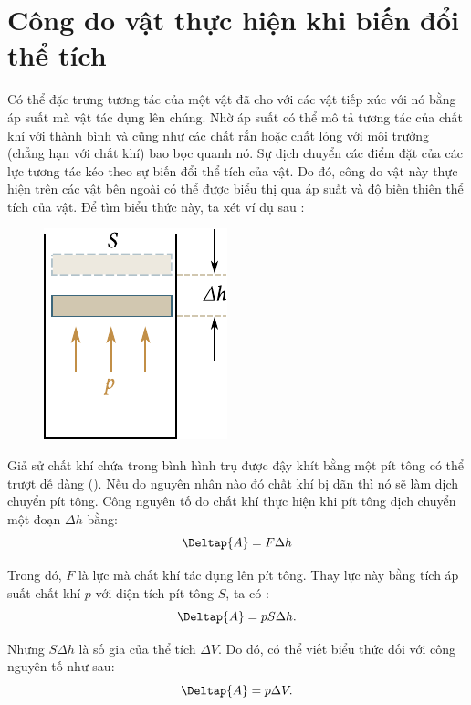 \section{Công do vật thực hiện khi biến đổi thể tích}\label{sec:10_6}

Có thể đặc trưng tương tác của một vật đã cho với các vật tiếp xúc với nó bằng áp suất mà vật tác dụng lên chúng. Nhờ áp suất có thể mô tả tương tác của chất khí với thành bình và cũng như các chất rắn hoặc chất lỏng với môi trường (chẳng hạn với chất khí) bao bọc quanh nó. Sự dịch chuyển các điểm đặt của các lực tương tác kéo theo sự biến đổi thể tích của vật. Do đó, công do vật này thực hiện trên các vật bên ngoài có thể được biểu thị qua áp suất và độ biến thiên thể tích của vật. Để tìm biểu thức này, ta xét ví dụ sau :

\begin{figure}[!htb]
	\begin{center}
		\includegraphics[scale=1.0]{figures/ch_10/fig_10_2.pdf}
		\caption[]{}
		\label{fig:10_2}
	\end{center}
\end{figure}

Giả sử chất khí chứa trong bình hình trụ được đậy khít bằng một pít tông có thể trượt dễ dàng (). Nếu do nguyên nhân nào đó chất khí bị dãn thì nó sẽ làm dịch chuyển pít tông. Công nguyên tố do chất khí thực hiện khi pít tông dịch chuyển một đoạn $\Delta h$ bằng:
\begin{equation*}
	\Deltap{A} = F \Delta h
\end{equation*}

\noindent
Trong đó, $F$ là lực mà chất khí tác dụng lên pít tông. Thay lực này bằng tích áp suất chất khí $p$ với diện tích pít tông $S$, ta có :
\begin{equation*}
	\Deltap{A} = p S \Delta h.
\end{equation*}

\noindent
Nhưng $S\Delta h$ là số gia của thể tích $\Delta V$. Do đó, có thể viết biểu thức đối với công nguyên tố như sau:
\begin{equation}\label{eq:10_10}
	\Deltap{A} = p\Delta V.
\end{equation}


